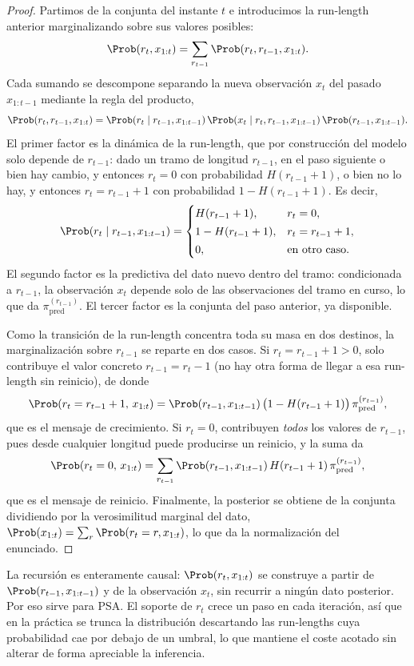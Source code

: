 \begin{proof}
Partimos de la conjunta del instante $t$ e introducimos la run-length anterior marginalizando sobre sus valores posibles:
\[
\Prob(r_t, x_{1:t}) = \sum_{r_{t-1}} \Prob(r_t, r_{t-1}, x_{1:t}).
\]
Cada sumando se descompone separando la nueva observación $x_t$ del pasado $x_{1:t-1}$ mediante la regla del producto,
\[
\Prob(r_t, r_{t-1}, x_{1:t})
= \Prob(r_t \mid r_{t-1}, x_{1:t-1})\,
  \Prob(x_t \mid r_t, r_{t-1}, x_{1:t-1})\,
  \Prob(r_{t-1}, x_{1:t-1}).
\]
El primer factor es la dinámica de la run-length, que por construcción del modelo solo depende de $r_{t-1}$: dado un tramo de longitud $r_{t-1}$, en el paso siguiente o bien hay cambio, y entonces $r_t = 0$ con probabilidad $H(r_{t-1}+1)$, o bien no lo hay, y entonces $r_t = r_{t-1}+1$ con probabilidad $1 - H(r_{t-1}+1)$. Es decir,
\[
\Prob(r_t \mid r_{t-1}, x_{1:t-1}) =
\begin{cases}
H(r_{t-1}+1), & r_t = 0,\\[2pt]
1 - H(r_{t-1}+1), & r_t = r_{t-1}+1,\\[2pt]
0, & \text{en otro caso.}
\end{cases}
\]
El segundo factor es la predictiva del dato nuevo dentro del tramo: condicionada a $r_{t-1}$, la observación $x_t$ depende solo de las observaciones del tramo en curso, lo que da $\pi^{(r_{t-1})}_{\mathrm{pred}}$. El tercer factor es la conjunta del paso anterior, ya disponible.

Como la transición de la run-length concentra toda su masa en dos destinos, la marginalización sobre $r_{t-1}$ se reparte en dos casos. Si $r_t = r_{t-1} + 1 > 0$, solo contribuye el valor concreto $r_{t-1} = r_t - 1$ (no hay otra forma de llegar a esa run-length sin reinicio), de donde
\[
\Prob(r_t = r_{t-1}+1,\, x_{1:t})
= \Prob(r_{t-1}, x_{1:t-1})\,\big(1 - H(r_{t-1}+1)\big)\,\pi^{(r_{t-1})}_{\mathrm{pred}},
\]
que es el mensaje de crecimiento. Si $r_t = 0$, contribuyen \emph{todos} los valores de $r_{t-1}$, pues desde cualquier longitud puede producirse un reinicio, y la suma da
\[
\Prob(r_t = 0,\, x_{1:t})
= \sum_{r_{t-1}} \Prob(r_{t-1}, x_{1:t-1})\, H(r_{t-1}+1)\, \pi^{(r_{t-1})}_{\mathrm{pred}},
\]
que es el mensaje de reinicio. Finalmente, la posterior se obtiene de la conjunta dividiendo por la verosimilitud marginal del dato, $\Prob(x_{1:t}) = \sum_{r}\Prob(r_t = r, x_{1:t})$, lo que da la normalización del enunciado.
\end{proof}

La recursión es enteramente causal: $\Prob(r_t, x_{1:t})$ se construye a partir de $\Prob(r_{t-1}, x_{1:t-1})$ y de la observación $x_t$, sin recurrir a ningún dato posterior. Por eso sirve para PSA. El soporte de $r_t$ crece un paso en cada iteración, así que en la práctica se trunca la distribución descartando las run-lengths cuya probabilidad cae por debajo de un umbral, lo que mantiene el coste acotado sin alterar de forma apreciable la inferencia.

